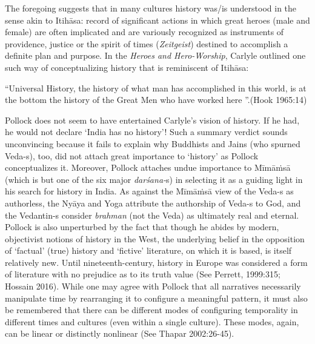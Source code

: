The foregoing suggests that in many cultures history was/is understood in the sense akin to Itihāsa: record of significant actions in which great heroes (male and female) are often implicated and are variously recognized as instruments of providence, justice or the spirit of times (\textit{Zeitgeist}) destined to accomplish a definite plan and purpose. In the \textit{Heroes and Hero-Worship}, Carlyle outlined one such way of conceptualizing history that is reminiscent of Itihāsa:

\begin{myquote}
“Universal History, the history of what man has accomplished in this world, is at the bottom the history of the Great Men who have worked here ”.\hfill (Hook 1965:14)
\end{myquote}

Pollock does not seem to have entertained Carlyle’s vision of history. If he had, he would not declare ‘India has no history’! Such a summary verdict sounds unconvincing because it fails to explain why Buddhists and Jains (who spurned Veda-s), too, did not attach great importance to ‘history’ as Pollock conceptualizes it. Moreover, Pollock attaches undue importance to Mīmāṁsā (which is but one of the six major \textit{darśana-}s) in selecting it as a guiding light in his search for history in India. As against the Mīmāṁsā view of the Veda-s as authorless, the Nyāya and Yoga attribute the authorship of Veda-s to God, and the Vedantin-s consider \textit{brahman} (not the Veda) as ultimately real and eternal. Pollock is also unperturbed by the fact that though he abides by modern, objectivist notions of history in the West, the underlying belief in the opposition of ‘factual’ (true) history and ‘fictive’ literature, on which it is based, is itself relatively new. Until nineteenth-century, history in Europe was considered a form of literature with no prejudice as to its truth value (See Perrett, 1999:315; Hossain 2016). While one may agree with Pollock that all narratives necessarily manipulate time by rearranging it to configure a meaningful pattern, it must also be remembered that there can be different modes of configuring temporality in different times and cultures (even within a single culture). These modes, again, can be linear or distinctly nonlinear (See Thapar 2002:26-45).


